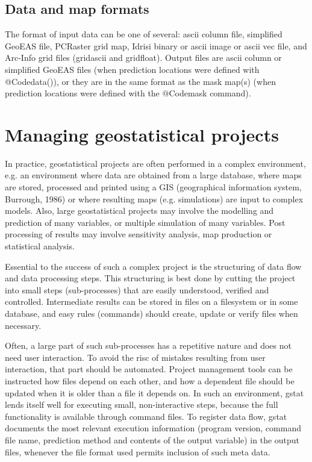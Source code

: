 \documentclass{article}
\begin{document}
\subsection{Data and map formats}
The format of input data can be one of several: ascii column file,
simplified GeoEAS file, PCRaster grid map, Idrisi binary or ascii image
or ascii vec file, and Arc-Info grid files (gridascii and gridfloat).
Output files are ascii column or simplified GeoEAS files (when prediction
locations were defined with @Code{data()}), or they are in the same
format as the mask map(s) (when prediction locations were defined with
the @Code{mask} command).

\section{ Managing geostatistical projects }
\label{how}

In practice, geostatistical projects are often performed in a complex
environment, e.g. an environment where data are obtained from a large
database, where maps are stored, processed and printed using a GIS
(geographical information system, Burrough, 1986) or where resulting
maps (e.g.  simulations) are input to complex models. Also, large
geostatistical projects may involve the modelling and prediction of many
variables, or multiple simulation of many variables. Post processing of
results may involve sensitivity analysis, map production or statistical
analysis.

Essential to the success of such a complex project is the structuring of
data flow and data processing steps. This structuring is best done by
cutting the project into small steps (sub-processes) that are easily
understood, verified and controlled. Intermediate results can be stored
in files on a filesystem or in some database, and easy rules (commands)
should create, update or verify files when necessary.

Often, a large part of such sub-processes has a repetitive nature and
does not need user interaction. To avoid the risc of mistakes resulting
from user interaction, that part should be automated. Project management
tools can be instructed how files depend on each other, and how a
dependent file should be updated when it is older than a file it depends
on. In such an environment, gstat lends itself well for executing small,
non-interactive steps, because the full functionality is available
through command files. To register data flow, gstat documents the most
relevant execution information (program version, command file name,
prediction method and contents of the output variable) in the output
files, whenever the file format used permits inclusion of such meta data.
\end{document}
